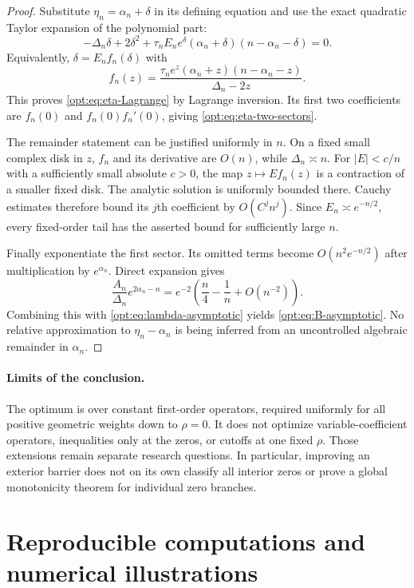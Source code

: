 \documentclass[11pt,a4paper]{article}
\theoremstyle{definition}
\theoremstyle{remark}
\numberwithin{equation}{section}
\begin{document}
\begin{proof}
Substitute $\eta_n=\alpha_n+\delta$ in its defining equation and use
the exact quadratic Taylor expansion of the polynomial part:
\[
 -\Delta_n\delta+2\delta^2+
 \tau_n E_ne^\delta(\alpha_n+\delta)(n-\alpha_n-\delta)=0.
\]
Equivalently, $\delta=E_nf_n(\delta)$ with
\[
 f_n(z)=
 \frac{\tau_ne^z(\alpha_n+z)(n-\alpha_n-z)}{\Delta_n-2z}.
\]
This proves \eqref{opt:eq:eta-Lagrange} by Lagrange inversion. Its
first two coefficients are $f_n(0)$ and $f_n(0)f_n'(0)$, giving
\eqref{opt:eq:eta-two-sectors}.

The remainder statement can be justified uniformly in $n$. On a fixed
small complex disk in $z$, $f_n$ and its derivative are $O(n)$, while
$\Delta_n\asymp n$. For $|E|<c/n$ with a sufficiently small absolute
$c>0$, the map $z\mapsto Ef_n(z)$ is a contraction of a smaller
fixed disk. The analytic solution is uniformly bounded there. Cauchy
estimates therefore bound its $j$th coefficient by $O(C^jn^j)$.
Since $E_n\asymp e^{-n/2}$, every fixed-order tail has the asserted
bound for sufficiently large $n$.

Finally exponentiate the first sector. Its omitted terms become
$O(n^2e^{-n/2})$ after multiplication by $e^{\alpha_n}$. Direct
expansion gives
\[
 \frac{A_n}{\Delta_n}e^{2\alpha_n-n}
 =e^{-2}\left(\frac n4-\frac1n+O(n^{-2})\right).
\]
Combining this with \eqref{opt:eq:lambda-asymptotic} yields
\eqref{opt:eq:B-asymptotic}. No relative approximation to
$\eta_n-\alpha_n$ is being inferred from an uncontrolled algebraic
remainder in $\alpha_n$.
\end{proof}

\paragraph{Limits of the conclusion.}
The optimum is over constant first-order operators, required uniformly
for all positive geometric weights down to $\rho=0$. It does not
optimize variable-coefficient operators, inequalities only at the zeros,
or cutoffs at one fixed $\rho$. Those extensions remain separate
research questions. In particular, improving an exterior barrier does
not on its own classify all interior zeros or prove a global
monotonicity theorem for individual zero branches.


\section{Reproducible computations and numerical illustrations}
\label{sec:computations}
\end{document}
